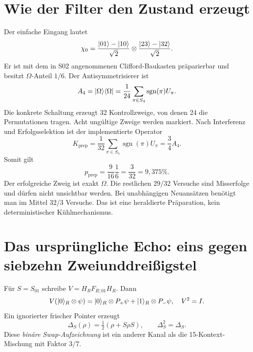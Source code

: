 \section{Wie der Filter den Zustand erzeugt}
Der einfache Eingang lautet
\begin{equation}
\chi_0=\frac{\lvert01\rangle-\lvert10\rangle}{\sqrt2}
\otimes\frac{\lvert23\rangle-\lvert32\rangle}{\sqrt2}.
\end{equation}
Er ist mit dem in S02 angenommenen Clifford-Baukasten präparierbar und besitzt $\Omega$-Anteil $1/6$. Der Antisymmetrisierer ist
\begin{equation}
A_4=\lvert\Omega\rangle\langle\Omega\rvert
=\frac1{24}\sum_{\pi\in S_4}\operatorname{sgn}(\pi)U_\pi.
\end{equation}
Die konkrete Schaltung erzeugt 32 Kontrollzweige, von denen 24 die Permutationen tragen. Acht ungültige Zweige werden markiert. Nach Interferenz und Erfolgsselektion ist der implementierte Operator
\begin{equation}
K_{\mathrm{prep}}=\frac1{32}\sum_{\pi\in S_4}\operatorname{sgn}(\pi)U_\pi
=\frac34A_4.
\end{equation}
Somit gilt
\begin{equation}
p_{\mathrm{prep}}=\frac9{16}\frac16=\frac3{32}=9{,}375\%.
\end{equation}
Der erfolgreiche Zweig ist exakt $\Omega$. Die restlichen $29/32$ Versuche sind Misserfolge und dürfen nicht unsichtbar werden. Bei unabhängigen Neuansätzen benötigt man im Mittel $32/3$ Versuche. Das ist eine heraldierte Präparation, kein deterministischer Kühlmechanismus.

\section{Das ursprüngliche Echo: eins gegen siebzehn Zweiunddreißigstel}
Für $S=S_{01}$ schreibe $V=H_RF_{R;01}H_R$. Dann
\begin{equation}
V(\lvert0\rangle_R\otimes\psi)=\lvert0\rangle_R\otimes P_+\psi+\lvert1\rangle_R\otimes P_-\psi,
\quad V^2=I.
\end{equation}
Ein ignorierter frischer Pointer erzeugt
\begin{equation}
\Delta_S(\rho)=\tfrac12(\rho+S\rho S),\qquad\Delta_S^2=\Delta_S.
\end{equation}
Diese \emph{binäre Swap-Aufzeichnung} ist ein anderer Kanal als die 15-Kontext-Mischung mit Faktor $3/7$.

